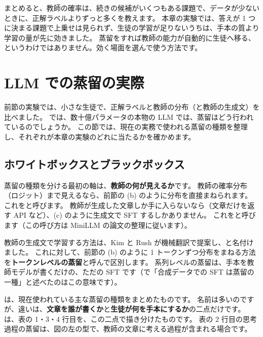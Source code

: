 まとめると、教師の確率は、続きの候補がいくつもある課題で、データが少ないときに、正解ラベルよりずっと多くを教えます。
本章の実験では、答えが 1 つに決まる課題で上乗せは見られず、生徒の学習が足りないうちは、手本の質より学習の量が先に効きました。
蒸留をすれば教師の能力が自動的に生徒へ移る、というわけではありません。効く場面を選んで使う方法です。


\section{LLM での蒸留の実際}\label{sec:distill-llm}

前節の実験では、小さな生徒で、正解ラベルと教師の分布（と教師の生成文）を比べました。
では、数十億パラメータの本物の LLM では、蒸留はどう行われているのでしょうか。
この節では、現在の実務で使われる蒸留の種類を整理し、それぞれが本章の実験のどれに当たるかを確かめます。

\subsection{ホワイトボックスとブラックボックス}

蒸留の種類を分ける最初の軸は、\textbf{教師の何が見えるか}です。
教師の確率分布（ロジット）まで見えるなら、前節の (b) のように分布を直接まねられます。
これをと呼びます。
教師が生成した文章しか手に入らないなら（文章だけを返す API など）、(c) のように生成文で SFT するしかありません。
これをと呼びます（この呼び方は MiniLLM の論文の整理に従います\cite{gu2024minillm}）。

教師の生成文で学習する方法は、Kim と Rush が機械翻訳で提案し、と名付けました\cite{kim2016sequence}。
これに対して、前節の (b) のように 1 トークンずつ分布をまねる方法を\textbf{トークンレベルの蒸留}と呼んで区別します。
系列レベルの蒸留は、手本を教師モデルが書くだけの、ただの SFT です（で「合成データでの SFT は蒸留の一種」と述べたのはこの意味です）。

は、現在使われている主な蒸留の種類をまとめたものです。
名前は多いのですが、違いは、\textbf{文章を誰が書くか}と\textbf{生徒が何を手本にするか}の二点だけです。
は、表の 1・3・4 行目を、この二点で描き分けたものです。
表の 2 行目の思考過程の蒸留は、図の左の型で、教師の文章に考える過程が含まれる場合です。


